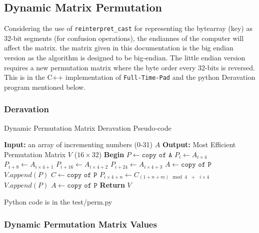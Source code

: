 \documentclass[fleqn, a4paper,12pt]{article}
\begin{document}
\subsection{Dynamic Matrix Permutation}

Considering the use of \texttt{reinterpret\_cast} for representing the bytearray (key) as 32-bit segments (for confusion operations), the endiannes of the computer will affect the matrix. the matrix given in this documentation is the big endian version as the algorithm is designed to be big-endian. The little endian version requires a new permutation matrix where the byte order every 32-bits is reversed. This is in the C++ implementation of \texttt{Full-Time-Pad} and the python Deravation program mentioned below.

\subsubsection{Deravation}

\begin{algorithm}[H] %
\caption{Dynamic Permutation Matrix Deravation Pseudo-code}
\begin{algorithmic}[1]  %
\State \textbf{Input:} an array of incrementing numbers (0-31) $A$ 
\State \textbf{Output:} Most Efficient Permutation Matrix $V$ ($16 \times 32$)
\State \textbf{Begin}
\State $P \gets \texttt{copy of A}$
		\State $P_i      \gets A_{i \times 4}$
		\State $P_{i+8}  \gets A_{i \times 4 + 1}$
		\State $P_{i+16} \gets A_{i \times 4 + 2}$
		\State $P_{i+24} \gets A_{i \times 4 + 3}$
	\EndFor
	\State $A \gets \texttt{copy of P}$
	\State $V.append(P)$
	\State $C \gets \texttt{copy of P}$
			\State $P_{i \times 4 + n} \gets C_{(1+n+m) \mod{4} \texttt{    } + \texttt{    } i \times 4}$
			\EndFor
		\EndFor
		\State $V.append(P)$
	\EndFor
	\State $A \gets \texttt{copy of P}$
\EndFor
\State \textbf{Return} $V$
\end{algorithmic}
\end{algorithm}

Python code is in the test/perm.py
 
\subsubsection{Dynamic Permutation Matrix Values} %
\end{document}
